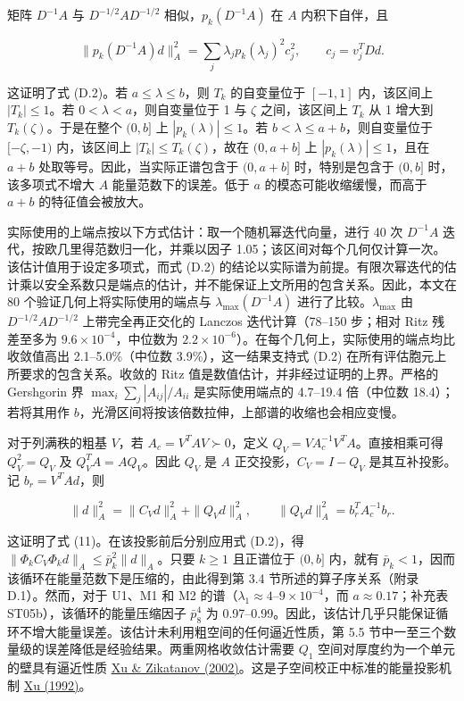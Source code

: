 \documentclass[preprint,12pt,authoryear]{elsarticle}
\begin{document}
矩阵 \(D^{-1}A\) 与 \(D^{-1/2}AD^{-1/2}\) 相似，\(p_k(D^{-1}A)\) 在 \(A\) 内积下自伴，且

\[
\|p_k(D^{-1}A)d\|_A^2
=\sum_j\lambda_j p_k(\lambda_j)^2c_j^2,
\qquad c_j=v_j^TDd.
\tag{D.4}
\]

这证明了式 (D.2)。若 \(a\le\lambda\le b\)，则 \(T_k\) 的自变量位于 \([-1,1]\) 内，该区间上 \(|T_k|\le1\)。若 \(0<\lambda<a\)，则自变量位于 1 与 \(\zeta\) 之间，该区间上 \(T_k\) 从 1 增大到 \(T_k(\zeta)\)。于是在整个 \((0,b]\) 上 \(|p_k(\lambda)|\le1\)。若 \(b<\lambda\le a+b\)，则自变量位于 \([-\zeta,-1)\) 内，该区间上 \(|T_k|\le T_k(\zeta)\)，故在 \((0,a+b]\) 上 \(|p_k(\lambda)|\le1\)，且在 \(a+b\) 处取等号。因此，当实际正谱包含于 \((0,a+b]\) 时，特别是包含于 \((0,b]\) 时，该多项式不增大 \(A\) 能量范数下的误差。低于 \(a\) 的模态可能收缩缓慢，而高于 \(a+b\) 的特征值会被放大。

实际使用的上端点按以下方式估计：取一个随机幂迭代向量，进行 40 次 \(D^{-1}A\) 迭代，按欧几里得范数归一化，并乘以因子 1.05；该区间对每个几何仅计算一次。该估计值用于设定多项式，而式 (D.2) 的结论以实际谱为前提。有限次幂迭代的估计乘以安全系数只是端点的估计，并不能保证上文所用的包含关系。因此，本文在 80 个验证几何上将实际使用的端点与 \(\lambda_{\max}(D^{-1}A)\) 进行了比较。\(\lambda_{\max}\) 由 \(D^{-1/2}AD^{-1/2}\) 上带完全再正交化的 Lanczos 迭代计算（78--150 步；相对 Ritz 残差至多为 \(9.6\times10^{-4}\)，中位数为 \(2.2\times10^{-6}\)）。在每个几何上，实际使用的端点均比收敛值高出 2.1--5.0\%（中位数 3.9\%），这一结果支持式 (D.2) 在所有评估胞元上所要求的包含关系。收敛的 Ritz 值是数值估计，并非经过证明的上界。严格的 Gershgorin 界 \(\max_i\sum_j|A_{ij}|/A_{ii}\) 是实际使用端点的 4.7--19.4 倍（中位数 18.4）；若将其用作 \(b\)，光滑区间将按该倍数拉伸，上部谱的收缩也会相应变慢。

对于列满秩的粗基 \(V\)，若 \(A_c=V^TAV\succ0\)，定义 \(Q_V=VA_c^{-1}V^TA\)。直接相乘可得 \(Q_V^2=Q_V\) 及 \(Q_V^TA=AQ_V\)。因此 \(Q_V\) 是 \(A\) 正交投影，\(C_V=I-Q_V\) 是其互补投影。记 \(b_r=V^TAd\)，则

\[
\|d\|_A^2=\|C_Vd\|_A^2+\|Q_Vd\|_A^2,
\qquad\|Q_Vd\|_A^2=b_r^TA_c^{-1}b_r.
\tag{D.5}
\]

这证明了式 (11)。在该投影前后分别应用式 (D.2)，得 \(\|\Phi_kC_V\Phi_kd\|_A\le\bar p_k^2\|d\|_A\)。只要 \(k\ge1\) 且正谱位于 \((0,b]\) 内，就有 \(\bar p_k<1\)，因而该循环在能量范数下是压缩的，由此得到第 3.4 节所述的算子序关系（附录 D.1）。然而，对于 U1、M1 和 M2 的谱（\(\lambda_1\approx4\)--\(9\times10^{-4}\)，而 \(a\approx0.17\)；补充表 ST05b），该循环的能量压缩因子 \(\bar p_8^4\) 为 0.97--0.99。因此，该估计几乎只能保证循环不增大能量误差。该估计未利用粗空间的任何逼近性质，第 5.5 节中一至三个数量级的误差降低是经验结果。两重网格收敛估计需要 \(Q_1\) 空间对厚度约为一个单元的壁具有逼近性质 \href{https://doi.org/10.1090/S0894-0347-02-00398-3}{Xu \& Zikatanov (2002)}。这是子空间校正中标准的能量投影机制 \href{https://doi.org/10.1137/1034116}{Xu (1992)}。
\end{document}
